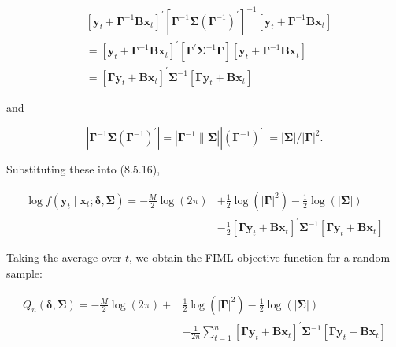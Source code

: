 \documentclass[10pt]{article}
\begin{document}
\begin{align*}
& {\left[\mathbf{y}_{t}+\boldsymbol{\Gamma}^{-1} \mathbf{B} \mathbf{x}_{t}\right]^{\prime}\left[\boldsymbol{\Gamma}^{-1} \boldsymbol{\Sigma}\left(\boldsymbol{\Gamma}^{-1}\right)^{\prime}\right]^{-1}\left[\mathbf{y}_{t}+\boldsymbol{\Gamma}^{-1} \mathbf{B} \mathbf{x}_{t}\right]} \\
& =\left[\mathbf{y}_{t}+\boldsymbol{\Gamma}^{-1} \mathbf{B} \mathbf{x}_{t}\right]^{\prime}\left[\boldsymbol{\Gamma}^{\prime} \boldsymbol{\Sigma}^{-1} \boldsymbol{\Gamma}\right]\left[\mathbf{y}_{t}+\boldsymbol{\Gamma}^{-1} \mathbf{B} \mathbf{x}_{t}\right] \\
& =\left[\boldsymbol{\Gamma} \mathbf{y}_{t}+\mathbf{B} \mathbf{x}_{t}\right]^{\prime} \boldsymbol{\Sigma}^{-1}\left[\boldsymbol{\Gamma} \mathbf{y}_{t}+\mathbf{B} \mathbf{x}_{t}\right] \tag{8.5.17}
\end{align*}


and


\begin{equation*}
\left|\boldsymbol{\Gamma}^{-1} \boldsymbol{\Sigma}\left(\boldsymbol{\Gamma}^{-1}\right)^{\prime}\right|=\left|\boldsymbol{\Gamma}^{-1} \| \boldsymbol{\Sigma}\right|\left|\left(\boldsymbol{\Gamma}^{-1}\right)^{\prime}\right|=|\boldsymbol{\Sigma}| /|\boldsymbol{\Gamma}|^{2} . \tag{8.5.18}
\end{equation*}


Substituting these into (8.5.16),


\begin{align*}
\log f\left(\mathbf{y}_{t} \mid \mathbf{x}_{t} ; \boldsymbol{\delta}, \mathbf{\Sigma}\right)=-\frac{M}{2} \log (2 \pi) & +\frac{1}{2} \log \left(|\boldsymbol{\Gamma}|^{2}\right)-\frac{1}{2} \log (|\mathbf{\Sigma}|) \\
& -\frac{1}{2}\left[\boldsymbol{\Gamma} \mathbf{y}_{t}+\mathbf{B} \mathbf{x}_{t}\right]^{\prime} \mathbf{\Sigma}^{-1}\left[\boldsymbol{\Gamma} \mathbf{y}_{t}+\mathbf{B} \mathbf{x}_{t}\right] \tag{8.5.19}
\end{align*}


Taking the average over $t$, we obtain the FIML objective function for a random sample:


\begin{align*}
Q_{n}(\boldsymbol{\delta}, \boldsymbol{\Sigma})=-\frac{M}{2} \log (2 \pi)+ & \frac{1}{2} \log \left(|\boldsymbol{\Gamma}|^{2}\right)-\frac{1}{2} \log (|\boldsymbol{\Sigma}|) \\
& -\frac{1}{2 n} \sum_{t=1}^{n}\left[\boldsymbol{\Gamma} \mathbf{y}_{t}+\mathbf{B} \mathbf{x}_{t}\right]^{\prime} \boldsymbol{\Sigma}^{-1}\left[\boldsymbol{\Gamma} \mathbf{y}_{t}+\mathbf{B} \mathbf{x}_{t}\right] \tag{8.5.20}
\end{align*}
\end{document}
